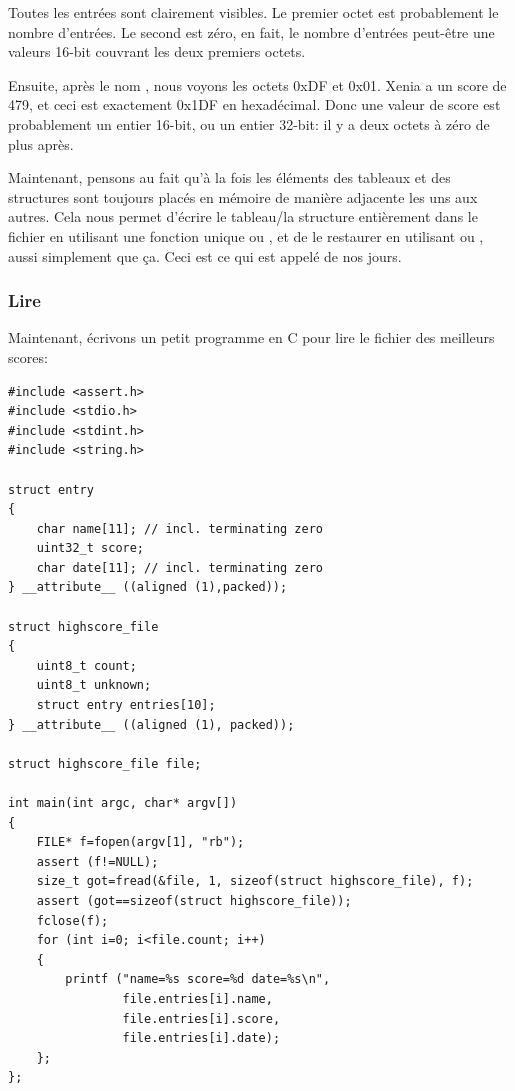 Toutes les entrées sont clairement visibles.
Le premier octet est probablement le nombre d'entrées.
Le second est zéro, en fait, le nombre d'entrées peut-être une valeurs 16-bit couvrant
les deux premiers octets.

Ensuite, après le nom , nous voyons les octets 0xDF et 0x01.
Xenia a un score de 479, et ceci est exactement 0x1DF en hexadécimal.
Donc une valeur de score est probablement un entier 16-bit, ou un entier 32-bit:
il y a deux octets à zéro de plus après.

Maintenant, pensons au fait qu'à la fois les éléments des tableaux et des structures
sont toujours placés en mémoire de manière adjacente les uns aux autres.
Cela nous permet d'écrire le tableau/la structure entièrement dans le fichier en
utilisant une fonction unique  ou , et de le restaurer en
utilisant  ou , aussi simplement que ça.
Ceci est ce qui est appelé  de nos jours.

\subsubsection{Lire}

Maintenant, écrivons un petit programme en C pour lire le fichier des meilleurs scores:

\begin{lstlisting}[style=customc]
#include <assert.h>
#include <stdio.h>
#include <stdint.h>
#include <string.h>

struct entry
{
	char name[11]; // incl. terminating zero
	uint32_t score;
	char date[11]; // incl. terminating zero
} __attribute__ ((aligned (1),packed));

struct highscore_file
{
	uint8_t count;
	uint8_t unknown;
	struct entry entries[10];
} __attribute__ ((aligned (1), packed));

struct highscore_file file;

int main(int argc, char* argv[])
{
	FILE* f=fopen(argv[1], "rb");
	assert (f!=NULL);
	size_t got=fread(&file, 1, sizeof(struct highscore_file), f);
	assert (got==sizeof(struct highscore_file));
	fclose(f);
	for (int i=0; i<file.count; i++)
	{
		printf ("name=%s score=%d date=%s\n",
				file.entries[i].name,
				file.entries[i].score,
				file.entries[i].date);
	};
};
\end{lstlisting}

